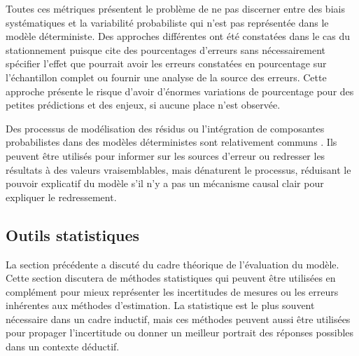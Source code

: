             Toutes ces métriques présentent le problème de ne pas discerner entre des biais systématiques et la variabilité probabiliste qui n'est pas représentée dans le modèle déterministe. Des approches différentes ont été constatées dans le cas du stationnement puisque \textcite{hoehne_urban_2022} cite des pourcentages d'erreurs sans nécessairement spécifier l'effet que pourrait avoir les erreurs constatées en pourcentage sur l'échantillon complet ou fournir une analyse de la source des erreurs. Cette approche présente le risque d'avoir d'énormes variations de pourcentage pour des petites prédictions et des enjeux, si aucune place n'est observée.\par
            Des processus de modélisation des résidus ou l'intégration de composantes probabilistes dans des modèles déterministes sont relativement communs \parencite{verma_comprehensive_2025,ting_model_2023,wong_biased_2016}. Ils peuvent être utilisés pour informer sur les sources d'erreur ou redresser les résultats à des valeurs vraisemblables, mais dénaturent le processus, réduisant le pouvoir explicatif du modèle s'il n'y a pas un mécanisme causal clair pour expliquer le redressement. 
    \subsection{Outils statistiques}\label{sec:statistical-methods}
        La section précédente a discuté du cadre théorique de l'évaluation du modèle. Cette section discutera de méthodes statistiques qui peuvent être utilisées en complément pour mieux représenter les incertitudes de mesures ou les erreurs inhérentes aux méthodes d'estimation. La statistique est le plus souvent nécessaire dans un cadre inductif, mais ces méthodes peuvent aussi être utilisées pour propager l'incertitude ou donner un meilleur portrait des réponses possibles dans un contexte déductif. 
